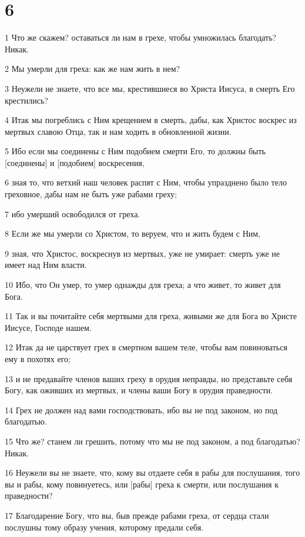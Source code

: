 \chapter{6}

\par 1 Что же скажем? оставаться ли нам в грехе, чтобы умножилась благодать? Никак.
\par 2 Мы умерли для греха: как же нам жить в нем?
\par 3 Неужели не знаете, что все мы, крестившиеся во Христа Иисуса, в смерть Его крестились?
\par 4 Итак мы погреблись с Ним крещением в смерть, дабы, как Христос воскрес из мертвых славою Отца, так и нам ходить в обновленной жизни.
\par 5 Ибо если мы соединены с Ним подобием смерти Его, то должны быть [соединены] и [подобием] воскресения,
\par 6 зная то, что ветхий наш человек распят с Ним, чтобы упразднено было тело греховное, дабы нам не быть уже рабами греху;
\par 7 ибо умерший освободился от греха.
\par 8 Если же мы умерли со Христом, то веруем, что и жить будем с Ним,
\par 9 зная, что Христос, воскреснув из мертвых, уже не умирает: смерть уже не имеет над Ним власти.
\par 10 Ибо, что Он умер, то умер однажды для греха; а что живет, то живет для Бога.
\par 11 Так и вы почитайте себя мертвыми для греха, живыми же для Бога во Христе Иисусе, Господе нашем.
\par 12 Итак да не царствует грех в смертном вашем теле, чтобы вам повиноваться ему в похотях его;
\par 13 и не предавайте членов ваших греху в орудия неправды, но представьте себя Богу, как оживших из мертвых, и члены ваши Богу в орудия праведности.
\par 14 Грех не должен над вами господствовать, ибо вы не под законом, но под благодатью.
\par 15 Что же? станем ли грешить, потому что мы не под законом, а под благодатью? Никак.
\par 16 Неужели вы не знаете, что, кому вы отдаете себя в рабы для послушания, того вы и рабы, кому повинуетесь, или [рабы] греха к смерти, или послушания к праведности?
\par 17 Благодарение Богу, что вы, быв прежде рабами греха, от сердца стали послушны тому образу учения, которому предали себя.
